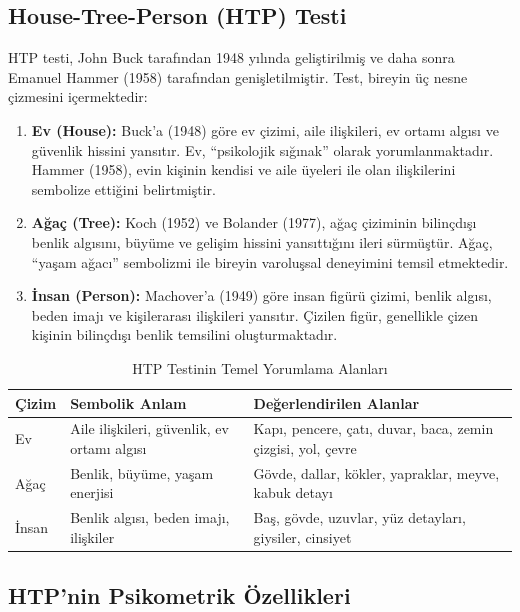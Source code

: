 \subsection{House-Tree-Person (HTP) Testi}

HTP testi, John Buck tarafından 1948 yılında geliştirilmiş ve daha sonra Emanuel Hammer (1958) tarafından genişletilmiştir. Test, bireyin üç nesne çizmesini içermektedir:

\begin{enumerate}
  \item \textbf{Ev (House):} Buck'a (1948) göre ev çizimi, aile ilişkileri, ev ortamı algısı ve güvenlik hissini yansıtır. Ev, ``psikolojik sığınak'' olarak yorumlanmaktadır. Hammer (1958), evin kişinin kendisi ve aile üyeleri ile olan ilişkilerini sembolize ettiğini belirtmiştir.

  \item \textbf{Ağaç (Tree):} Koch (1952) ve Bolander (1977), ağaç çiziminin bilinçdışı benlik algısını, büyüme ve gelişim hissini yansıttığını ileri sürmüştür. Ağaç, ``yaşam ağacı'' sembolizmi ile bireyin varoluşsal deneyimini temsil etmektedir.

  \item \textbf{İnsan (Person):} Machover'a (1949) göre insan figürü çizimi, benlik algısı, beden imajı ve kişilerarası ilişkileri yansıtır. Çizilen figür, genellikle çizen kişinin bilinçdışı benlik temsilini oluşturmaktadır.
\end{enumerate}

\begin{table}[H]
\centering
\caption{HTP Testinin Temel Yorumlama Alanları}
\label{tab:htpyorumlama}
\begin{tabular}{p{2.5cm}p{4.5cm}p{5.5cm}}
\toprule
\textbf{Çizim} & \textbf{Sembolik Anlam} & \textbf{Değerlendirilen Alanlar} \\
\midrule
Ev & Aile ilişkileri, güvenlik, ev ortamı algısı & Kapı, pencere, çatı, duvar, baca, zemin çizgisi, yol, çevre \\
Ağaç & Benlik, büyüme, yaşam enerjisi & Gövde, dallar, kökler, yapraklar, meyve, kabuk detayı \\
İnsan & Benlik algısı, beden imajı, ilişkiler & Baş, gövde, uzuvlar, yüz detayları, giysiler, cinsiyet \\
\bottomrule
\end{tabular}
\end{table}

\subsection{HTP'nin Psikometrik Özellikleri}

